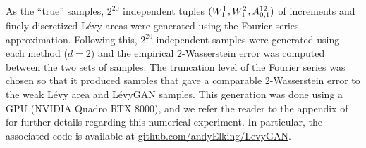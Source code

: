 \documentclass[sn-mathphys-num]{sn-jnl}%
\newcommand{\m}{\hspace{0.25mm}}
\begin{document}
As the ``true'' samples, $2^{20}$ independent tuples $(W_1^1\m, W_1^2\m, A_{0,1}^{12})$ of increments and finely discretized L\'{e}vy areas were generated using the Fourier series approximation.
Following this, $2^{20}$ independent samples were generated using each method ($d=2$) and the empirical $2$-Wasserstein error was computed between the two sets of samples.
The truncation level of the Fourier series was chosen so that it produced samples that gave a comparable $2$-Wasserstein error to the weak L\'{e}vy area and L\'{e}vyGAN samples. 
This generation was done using a GPU (NVIDIA Quadro RTX 8000), and we refer the reader to the appendix of \cite{jelincic2025levygan} for further details regarding this numerical experiment.
In particular, the associated code is available at \href{https://github.com/andyElking/LevyGAN}{github.com/andyElking/LevyGAN}.\vspace*{-1.5mm}
\end{document}

